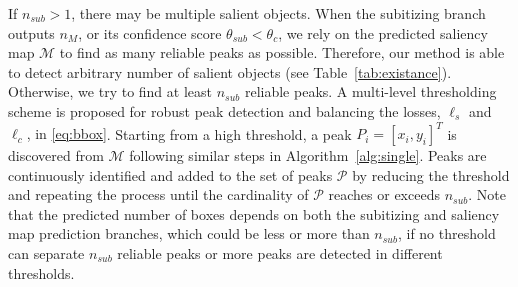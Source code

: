 \documentclass[10pt,twocolumn,letterpaper]{article}
\begin{document}
If $n_{sub}>1$, there may be multiple salient objects.
When {the subitizing branch outputs $n_M$, or its confidence score $\theta_{sub}<\theta_c$, we rely on the predicted saliency map $\mathcal{M}$ to find as many reliable peaks as possible. Therefore, our method is able to detect arbitrary number of salient objects (see Table~\ref{tab:existance}).}  Otherwise, we try to find at least $n_{sub}$ {reliable} peaks.
A multi-level thresholding scheme is proposed for robust peak detection {and balancing the losses, $\ell_s$ and $\ell_c$, in \eqref{eq:bbox}}. Starting from a high threshold, a peak $P_i=[x_i,y_i]^T$ is discovered from $\mathcal{M}$ following similar steps in Algorithm~\ref{alg:single}. Peaks are continuously identified and added to the set of peaks $\mathcal{P}$ by reducing the threshold and repeating the process until the cardinality of $\mathcal{P}$ reaches or exceeds $n_{sub}$. {Note that the predicted number of boxes depends on both the subitizing and saliency map prediction branches, which could be less or more than $n_{sub}$, if no threshold can separate $n_{sub}$ reliable peaks or more peaks are detected in different thresholds.}
\end{document}
